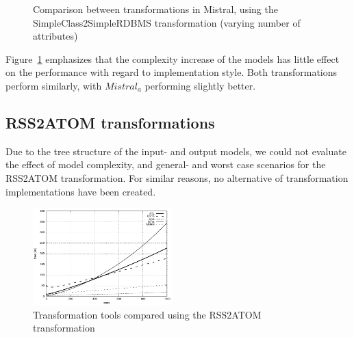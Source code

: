 \documentclass[12pt]{elsarticle}
\begin{document}
\begin{figure}[thb]
\centering
{}
\caption{Comparison between transformations in Mistral, using the
SimpleClass2SimpleRDBMS transformation (varying number of
attributes)\label{fig:mistral_classes_compared}}
\end{figure}

Figure~\ref{fig:mistral_classes_compared} emphasizes that the complexity
increase of the models has little effect on the performance with regard to
implementation style. Both transformations perform similarly, with $Mistral_a$ performing slightly better.

\subsection{RSS2ATOM transformations}

Due to the tree structure of the input- and output models, we could not evaluate
the effect of model complexity, and general- and worst case scenarios for the
RSS2ATOM transformation. For similar reasons, no alternative of
transformation implementations have been created.

\begin{figure}[thb]
\centering
\includegraphics[width=0.478\textwidth]{results/rss2atom}
\caption{Transformation tools compared using the RSS2ATOM
transformation\label{fig:RSS2ATOM}}
\end{figure}
\end{document}
